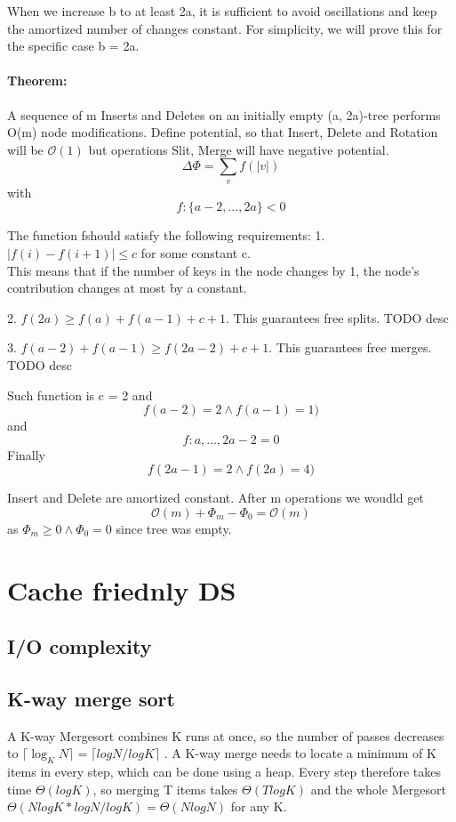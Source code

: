 \documentclass[12pt]{article}
\newcommand{\bigO}{\mathcal{O}}
\begin{document}
When we increase b to at least 2a, it is sufficient to avoid oscillations and keep the amortized number of changes constant.
For simplicity, we will prove this for the specific case b = 2a.

\paragraph{Theorem:} A sequence of m Inserts and Deletes on an initially empty (a, 2a)-tree performs O(m) node modifications.
Define potential, so that Insert, Delete and Rotation will be $\bigO(1)$ but operations Slit, Merge will have negative potential.
\[ \Delta \Phi = \sum_{v} f(|v|)  \]
with
\[ f:\{ a-2, ..., 2a \} < 0 \]

The function fshould satisfy the following requirements:
1. $|f (i) - f (i + 1)| \leq c$ for some constant c. \\

This means that if the number of keys in the node changes by 1, the node’s contribution changes at most by a constant.

2. $f(2a) \geq f(a) + f(a - 1) + c + 1$.
This guarantees free splits. TODO desc

3. $f(a - 2) + f(a - 1) \geq f(2a - 2) + c + 1$.
This guarantees free merges. TODO desc

Such function is c = 2 and
\[ f(a-2) = 2 \land f(a-1) = 1) \]
and
\[ f:{a, ..., 2a-2} = 0 \]
Finally
\[ f(2a-1) = 2 \land f(2a) = 4) \]

Insert and Delete are amortized constant. After m operations we woudld get
\[ \bigO(m) + \Phi_m - \Phi_0 = \bigO(m) \]
as $ \Phi_m \geq 0 \land \Phi_0 = 0 $ since tree was empty.

\section{Cache friednly DS}
\subsection{I/O complexity}
\subsection{K-way merge sort}
A K-way Mergesort combines K runs at once, so the number of passes decreases to $ \lceil \log_K N \rceil = \lceil log N/log K \rceil$ .
A K-way merge needs to locate a minimum of K items in every step, which can be done using a heap.
Every step therefore takes time $ \Theta(log K)$, so merging T items takes $\Theta(T log K) $ and the whole Mergesort $ \Theta(N log K * log N/ log K) = \Theta(N log N )$ for any K.
\end{document}
